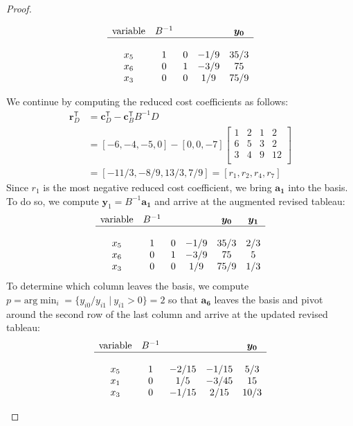 \documentclass[12pt]{article}
\theoremstyle{definition}
\newcommand{\vect}[1]{\boldsymbol{#1}}
\newcommand{\tran}{\mathsf{T}}
\begin{document}
\begin{proof}
\begin{enumerate}
      \begin{align*}
        \begin{matrix}
          \text{variable} & B^{-1} & & & \vect{y_0} \\
          \hline \\
          x_5 & 1 & 0 & -1/9 & 35/3 \\
          x_6 & 0 & 1 & -3/9 & 75 \\
          x_3 & 0 & 0 & 1/9 & 75/9 \\
        \end{matrix}
      \end{align*}

      We continue by computing the reduced cost coefficients as follows:
      \begin{align*}
        \vect{r}_D^\tran &= \vect{c}_D^\tran - \vect{c}_B^\tran B^{-1} D \\
        &= [-6, -4, -5, 0] - [0, 0, -7]
        \begin{bmatrix}
          1 & 2 & 1 & 2 \\
          6 & 5 & 3 & 2 \\
          3 & 4 & 9 & 12 \\
        \end{bmatrix} \\
        &= [-11/3, -8/9, 13/3, 7/9] = [r_1, r_2, r_4, r_7]
      \end{align*}
      Since $r_1$ is the most negative reduced cost coefficient, we bring $\vect{a_1}$ into the basis.
      To do so, we compute $\vect{y}_1 = B^{-1}\vect{a_1}$ and arrive
      at the augmented revised tableau:
      \begin{align*}
        \begin{matrix}
          \text{variable} & B^{-1} & & & \vect{y_0} & \vect{y_1} \\
          \hline \\
          x_5 & 1 & 0 & -1/9 & 35/3 & 2/3\\
          x_6 & 0 & 1 & -3/9 & 75 & 5\\
          x_3 & 0 & 0 & 1/9 & 75/9 & 1/3\\
        \end{matrix}
      \end{align*}
      To determine which column leaves the basis, we compute
      $p = \text{arg}\min_i = \{y_{i0} / y_{i1} \ | \ y_{i1} > 0\} = 2$ so that $\vect{a_6}$
      leaves the basis and pivot around the second row of the last column and arrive at the updated revised tableau:
      \begin{align*}
        \begin{matrix}
          \text{variable} & B^{-1} & & & \vect{y_0} \\
          \hline \\
          x_5 & 1 & -2/15 & -1/15 & 5/3\\
          x_1 & 0 & 1/5 & -3/45 & 15\\
          x_3 & 0 & -1/15 & 2/15 & 10/3\\
        \end{matrix}
      \end{align*}


\end{enumerate}
\end{proof}
\end{document}
